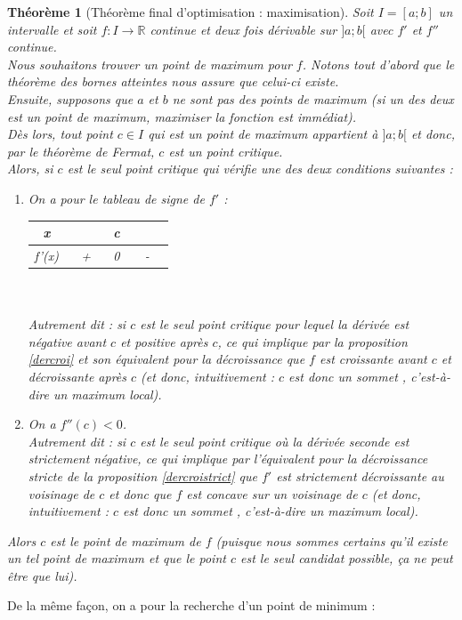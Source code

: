 \documentclass[a4paper,fontsize=13pt]{scrreprt}
\theoremstyle{plain}
\newtheorem{thé}[subsection]{Théorème}
\theoremstyle{definition}
\newcommand{\rr}{\mathbb{R}}
\begin{document}
\begin{thé} [Théorème final d'optimisation : maximisation]
Soit $I=[a;b]$ un intervalle et soit $f : I \to \rr$ continue et deux fois dérivable sur $]a;b[$ avec $f'$ et $f''$ continue.\\
Nous souhaitons trouver un point de maximum pour $f$. Notons tout d'abord que le théorème des bornes atteintes nous assure que celui-ci existe. \\
Ensuite, supposons que $a$ et $b$ ne sont pas des points de maximum (si un des deux est un point de maximum, maximiser la fonction est immédiat). \\
Dès lors, tout point $c \in I$ qui est un point de maximum appartient à $]a;b[$ et donc, par le théorème de Fermat, $c$ est un point critique. \\
Alors, si $c$ est le seul point critique qui vérifie une des deux conditions suivantes :
\begin{enumerate}
\item On a pour le tableau de signe de $f'$ :
\begin{tabular}{|c|c c c|}
  \hline
  x & ~~~~ & c & ~~~~ \\
  \hline
  f'(x) & + & 0 & - \\
  \hline
\end{tabular}
~~\\
~~\\
Autrement dit : si $c$ est le seul point critique pour lequel la dérivée est négative avant $c$ et positive après $c$, ce qui implique par la proposition \ref{dercroi} et son équivalent pour la décroissance que $f$ est croissante avant $c$ et décroissante après $c$ (et donc, intuitivement : $c$ est donc un \og sommet \fg{}, c'est-à-dire un maximum local).
\item On a $f''(c) < 0$. \\
Autrement dit : si $c$ est le seul point critique où la dérivée seconde est strictement négative, ce qui implique par l'équivalent pour la décroissance stricte de la proposition \ref{dercroistrict} que $f'$ est strictement décroissante au voisinage de $c$ et donc que $f$ est concave sur un voisinage de $c$ (et donc, intuitivement : $c$ est donc un \og sommet \fg{}, c'est-à-dire un maximum local).
\end{enumerate}
Alors $c$ est le point de maximum de $f$ (puisque nous sommes certains qu'il existe un tel point de maximum et que le point $c$ est le seul candidat possible, ça ne peut être que lui).
\end{thé}
De la même façon, on a pour la recherche d'un point de minimum :
\end{document}
